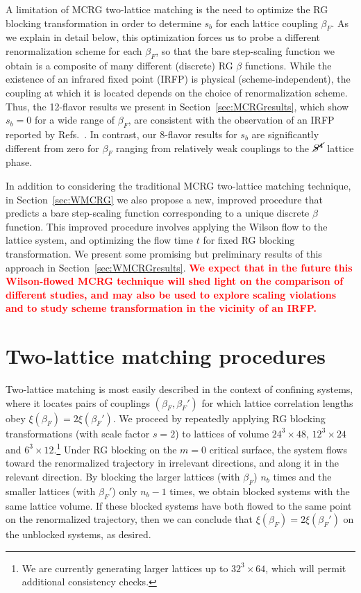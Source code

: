 \documentclass{PoS}
\newcommand{\be}{\ensuremath{\beta} }
\newcommand{\X}{\ensuremath{\!\times\!} }
\newcommand{\Sb}{\ensuremath{\cancel{S^4}} }
\newcommand{\secref}[1]{Section~\ref{#1}}
\newcommand{\TODO}[1]{\textcolor{red}{{\bf #1}}}
\begin{document}
A limitation of MCRG two-lattice matching is the need to optimize the RG blocking transformation in order to determine $s_b$ for each lattice coupling $\be_F$.
As we explain in detail below, this optimization forces us to probe a different renormalization scheme for each $\be_F$, so that the bare step-scaling function we obtain is a composite of many different (discrete) RG \be functions.
While the existence of an infrared fixed point (IRFP) is physical (scheme-independent), the coupling at which it is located depends on the choice of renormalization scheme.
Thus, the 12-flavor results we present in \secref{sec:MCRGresults}, which show $s_b = 0$ for a wide range of $\be_F$, are consistent with the observation of an IRFP reported by Refs.~\cite{Hasenfratz:2011xn, Hasenfratz:2011np}.
In contrast, our 8-flavor results for $s_b$ are significantly different from zero for $\be_F$ ranging from relatively weak couplings to the \Sb lattice phase.

In addition to considering the traditional MCRG two-lattice matching technique, in \secref{sec:WMCRG} we also propose a new, improved procedure that predicts a bare step-scaling function corresponding to a unique discrete \be function.
This improved procedure involves applying the Wilson flow to the lattice system, and optimizing the flow time $t$ for fixed RG blocking transformation.
We present some promising but preliminary results of this approach in \secref{sec:WMCRGresults}.
\TODO{We expect that in the future this Wilson-flowed MCRG technique will shed light on the comparison of different studies, and may also be used to explore scaling violations and to study scheme transformation in the vicinity of an IRFP.}



\section{Two-lattice matching procedures} %
Two-lattice matching is most easily described in the context of confining systems, where it locates pairs of couplings $(\be_F, \be_F')$ for which lattice correlation lengths obey $\xi(\be_F) = 2\xi(\be_F')$.
We proceed by repeatedly applying RG blocking transformations (with scale factor $s = 2$) to lattices of volume $24^3\X48$, $12^3\X24$ and $6^3\X12$.\footnote{We are currently generating larger lattices up to $32^3\X64$, which will permit additional consistency checks.}
Under RG blocking on the $m = 0$ critical surface, the system flows toward the renormalized trajectory in irrelevant directions, and along it in the relevant direction.
By blocking the larger lattices (with $\be_F$) $n_b$ times and the smaller lattices (with $\be_F'$) only $n_b - 1$ times, we obtain blocked systems with the same lattice volume.
If these blocked systems have both flowed to the same point on the renormalized trajectory, then we can conclude that $\xi(\be_F) = 2\xi(\be_F')$ on the unblocked systems, as desired.
\end{document}
